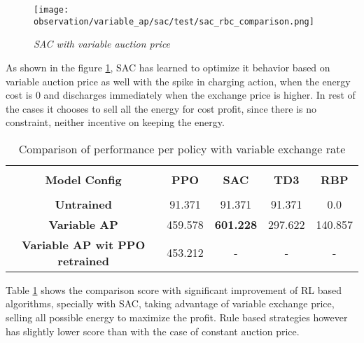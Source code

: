 \begin{large}
\begin{figure}[h]
	\begin{center}
		\texttt{[image: observation/variable\_ap/sac/test/sac\_rbc\_comparison.png]}
		\caption{ \textit{SAC with variable auction price} }
		\label{fig:test_compare_variable_ap_sac}
	\end{center}
\end{figure}

As shown in the figure \ref{fig:test_compare_variable_ap_sac}, SAC has learned to optimize it behavior based on variable auction price as well with the spike in charging action, when the energy cost is $0$ and discharges immediately when the exchange price is higher. In rest of the cases it chooses to sell all the energy for cost profit, since there is no constraint, neither incentive on keeping the energy. \\

\begin{table}
	\begin{center}
		\begin{tabular}{ccccc} 
			\hline %
			\vspace{0.5pt} \\
			\textbf{Model Config} & \textbf{PPO} & \textbf{SAC} & \textbf{TD3} & \textbf{RBP} \\ %
			\hline %
			\vspace{0.5pt} \\
			\textbf{Untrained} & 91.371 & 91.371  & 91.371  & 0.0 \\
			\textbf{Variable AP} & 459.578 & \textbf{601.228}  & 297.622  & 140.857 \\
			\textbf{Variable AP wit PPO retrained} & 453.212 & -  & -  & - \\
			\hline %
		\end{tabular}
		\caption{Comparison of performance per policy with variable exchange rate}
		\label{table:comparison_variable_ap} %
		
	\end{center}
\end{table}

Table \ref{table:comparison_variable_ap} shows the comparison score with significant improvement of RL based algorithms, specially with SAC, taking advantage of variable exchange price, selling all possible energy to maximize the profit. Rule based strategies however has slightly lower score than with the case of constant auction price. \\


\end{large}
